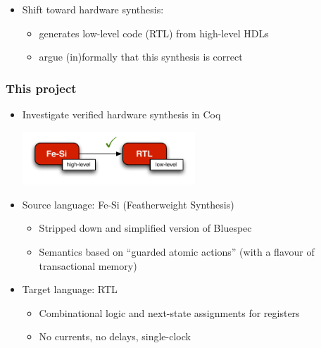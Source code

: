 \documentclass[9pt]{beamer}
\newcommand\fesi{Fe-Si}
\begin{document}
\begin{frame}
\begin{itemize}
    \pause
    
  \item Shift toward \alert{hardware synthesis}: 
    \begin{itemize}
    \item generates low-level code (RTL) from high-level HDLs
    \item argue (in)formally that this synthesis is correct
    \end{itemize}
  \end{itemize}
\end{frame}

\begin{frame}
  \frametitle{This project}
  \begin{itemize}
  \item  Investigate verified hardware synthesis in Coq
    
    \begin{center}
      \includegraphics[height= 2cm ]{figs/compilation.pdf}
    \end{center}
    \pause
    
  \item Source language: \alert{\fesi{}} (Featherweight Synthesis)
    \begin{itemize}
    \item Stripped down and simplified version of \alert{Bluespec} 
    \item Semantics based on ``guarded atomic actions'' (with a flavour of transactional memory)
    \end{itemize}
    
    \pause
    
  \item Target language: RTL
    \begin{itemize}
    \item Combinational logic and next-state assignments for registers
    \item No currents, no delays, single-clock
    \end{itemize}
  \end{itemize}
\end{frame}
\end{document}
